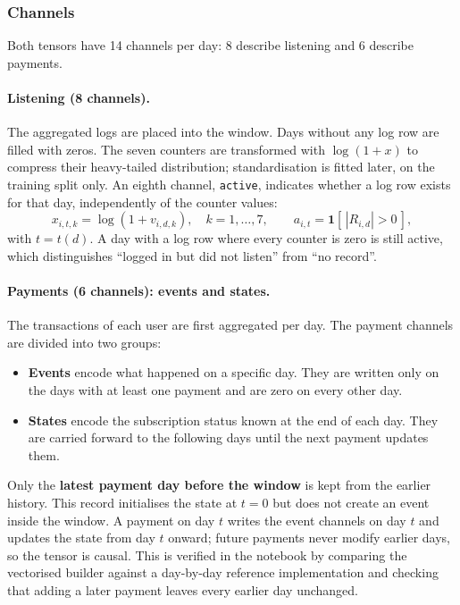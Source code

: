 \documentclass{article}
\newcommand{\ind}{\mathbf{1}}
\begin{document}
\subsubsection{Channels}
\label{sec:w2_channels}

Both tensors have 14 channels per day: 8 describe listening and 6 describe payments.

\paragraph{Listening (8 channels).} The aggregated logs are placed into the window. Days without any log row are filled with zeros. The seven counters are transformed with $\log(1+x)$ to compress their heavy-tailed distribution; standardisation is fitted later, on the training split only. An eighth channel, \texttt{active}, indicates whether a log row exists for that day, independently of the counter values:
\begin{equation}
x_{i,t,k} = \log\!\left(1 + v_{i,d,k}\right), \quad k = 1,\dots,7, \qquad
a_{i,t} = \ind\!\left[\,|R_{i,d}| > 0\,\right],
\end{equation}
with $t = t(d)$. A day with a log row where every counter is zero is still active, which distinguishes ``logged in but did not listen'' from ``no record''.

\paragraph{Payments (6 channels): events and states.} The transactions of each user are first aggregated per day. The payment channels are divided into two groups:
\begin{itemize}
    \item \textbf{Events} encode what happened on a specific day. They are written only on the days with at least one payment and are zero on every other day.
    \item \textbf{States} encode the subscription status known at the end of each day. They are carried forward to the following days until the next payment updates them.
\end{itemize}
Only the \textbf{latest payment day before the window} is kept from the earlier history. This record initialises the state at $t = 0$ but does not create an event inside the window. A payment on day $t$ writes the event channels on day $t$ and updates the state from day $t$ onward; future payments never modify earlier days, so the tensor is causal. This is verified in the notebook by comparing the vectorised builder against a day-by-day reference implementation and checking that adding a later payment leaves every earlier day unchanged.
\end{document}
